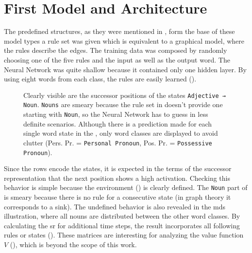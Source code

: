 \section{First Model and Architecture} \label{sec: first model and architecture MR}
The predefined structures, as they were mentioned in , form the base of these model types \ie a rule set was given which is equivalent to a graphical model, where the rules describe the edges. The training data was composed by randomly choosing one of the five rules and the input as well as the output word. The Neural Network was quite shallow because it contained only one hidden layer.
By using eight words from each class, the rules are easily learned (\figref{\ref{fig: first model tpm and mds}}).
\begin{figure}
	\centering
		\hfill
	\caption{Clearly visible are the successor positions of the states \eg \texttt{Adjective → Noun}. \texttt{Nouns} are smeary because the rule set in  doesn't provide one starting with \texttt{Noun}, so the Neural Network has to guess in less definite scenarios. Although there is a prediction made for each single word \ie state in the \cognitiveroom{}, only word classes are displayed to avoid clutter (Pers. Pr. = \texttt{Personal Pronoun}, Pos. Pr. = \texttt{Possessive Pronoun}).}
	\label{fig: first model tpm and mds}
\end{figure}
Since the rows encode the states, it is expected in the terms of the successor representation that the next position shows a high activation. Checking this behavior is simple because the environment () is clearly defined. The \texttt{Noun} part of \figref{\ref{fig: first model tpm and mds}} is smeary because there is no rule for a consecutive state (in graph theory it corresponds to a sink). The undefined behavior is also revealed in the \gls{mds} illustration, where all nouns are distributed between the other word classes. By calculating the \gls{sr} for additional time steps, the result incorporates all following rules or states (\figref{\ref{fig: first model sr t=3, df=0.5}}). These matrices are interesting for analyzing the value function $ V $ (\equref{\eqref{eq: v with sr-matrix}}), which is beyond the scope of this work.

